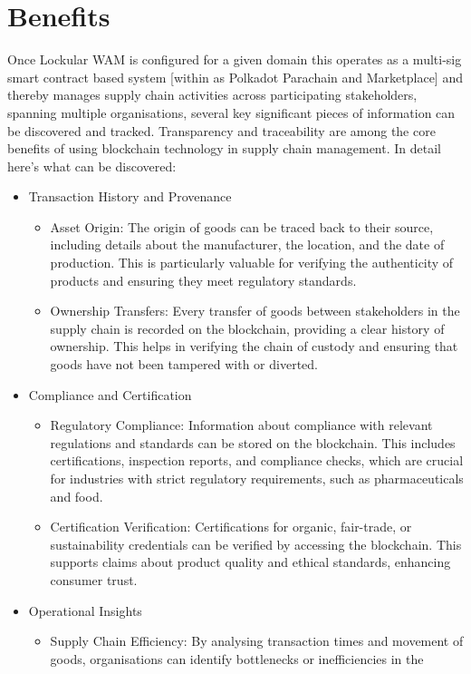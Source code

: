 \documentclass{tufte-handout}
\begin{document}
\section{Benefits}\label{sec:page-layout}
Once Lockular WAM is configured for a given domain this operates as a multi-sig smart contract based system [within as Polkadot Parachain and Marketplace]
and thereby manages supply chain activities across participating stakeholders, spanning multiple organisations, several key significant pieces of information
can be discovered and tracked. Transparency and traceability are among the core benefits of using blockchain technology in supply chain management. In detail
here's what can be discovered:
\begin{itemize}
\item Transaction History and Provenance
\begin{itemize}
    \item Asset Origin: The origin of goods can be traced back to their source, including details about the manufacturer, the location, and the date of
    production. This is particularly valuable for verifying the authenticity of products and ensuring they meet regulatory standards.
    \item Ownership Transfers: Every transfer of goods between stakeholders in the supply chain is recorded on the blockchain, providing a clear history
    of ownership. This helps in verifying the chain of custody and ensuring that goods have not been tampered with or diverted.
\end{itemize}
\item Compliance and Certification
\begin{itemize}
    \item Regulatory Compliance: Information about compliance with relevant regulations and standards can be stored on the blockchain. This includes
    certifications, inspection reports, and compliance checks, which are crucial for industries with strict regulatory requirements, such as
    pharmaceuticals and food.
    \item Certification Verification: Certifications for organic, fair-trade, or sustainability credentials can be verified by accessing the blockchain. This
    supports claims about product quality and ethical standards, enhancing consumer trust.
\end{itemize}
\item Operational Insights
\begin{itemize}
    \item Supply Chain Efficiency: By analysing transaction times and movement of goods, organisations can identify bottlenecks or inefficiencies in the

\end{itemize}
\end{itemize}
\end{document}
